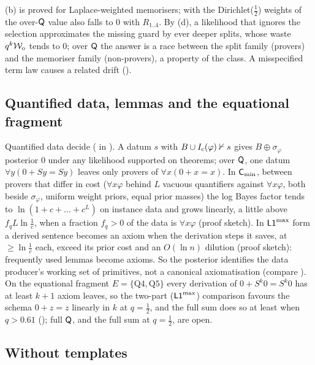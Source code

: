 \noindent (b) is proved for Laplace-weighted memorisers; with the Dirichlet($\tfrac12$) weights of  the over-$\mathsf{Q}$ value also falls to $0$ with $R_{1..4}$. By (d), a likelihood that ignores the selection approximates the missing guard by ever deeper splits, whose waste $q^k\mathcal{W}_{\mathrm{o}}$ tends to $0$; over $\mathsf{Q}$ the answer is a race between the split family (provers) and the memoriser family (non-provers), a property of the class. A misspecified term law causes a related drift ().

\subsection{Quantified data, lemmas and the equational fragment}\label{sec:univ:quant}

Quantified data decide ( in ). A datum $s$ with $B\cup I_{\mathrm{c}}(\varphi)\nvdash s$ gives $B\oplus\sigma_\varphi$ posterior $0$ under any likelihood supported on theorems; over $\mathsf{Q}$, one datum $\forall y(0+Sy=Sy)$ leaves only provers of $\forall x(0+x=x)$. In $\mathsf{C}_{\min}$, between provers that differ in cost ($\forall x\varphi$ behind $L$ vacuous quantifiers against $\forall x\varphi$, both beside $\sigma_\varphi$, uniform weight priors, equal prior masses) the log Bayes factor tends to $\ln(1+c+\dots+c^L)$ on instance data and grows linearly, a little above $f_qL\ln\frac1c$, when a fraction $f_q>0$ of the data is $\forall x\varphi$ (proof sketch). In $\mathord{\mathsf{L1}}^{\max}$ form a derived sentence becomes an axiom when the derivation steps it saves, at $\ge\ln\frac1c$ each, exceed its prior cost and an $O(\ln n)$ dilution (proof sketch): frequently used lemmas become axioms. So the posterior identifies the data producer's working set of primitives, not a canonical axiomatisation (compare ). On the equational fragment $E=\{\text{Q4},\text{Q5}\}$ every derivation of $0+S^k0=S^k0$ has at least $k+1$ axiom leaves, so the two-part ($\mathord{\mathsf{L1}}^{\max}$) comparison favours the schema $0+z=z$ linearly in $k$ at $q=\tfrac12$, and the full sum does so at least when $q>0.61$ (); full $\mathsf{Q}$, and the full sum at $q=\tfrac12$, are open.

\subsection{Without templates}\label{sec:univ:sentences}

